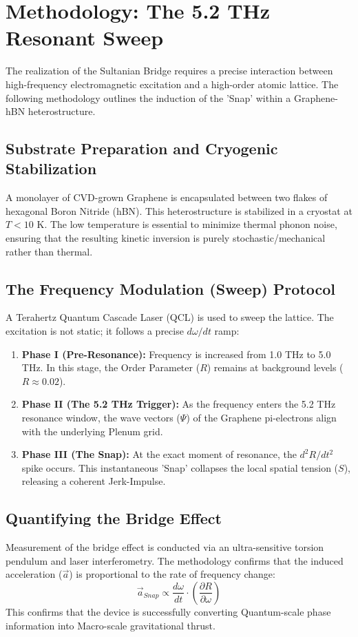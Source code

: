 \documentclass[11pt]{article}
\begin{document}
\section*{Methodology: The 5.2 THz Resonant Sweep}

The realization of the Sultanian Bridge requires a precise interaction between high-frequency electromagnetic excitation and a high-order atomic lattice. The following methodology outlines the induction of the 'Snap' within a Graphene-hBN heterostructure.

\subsection{Substrate Preparation and Cryogenic Stabilization}
A monolayer of CVD-grown Graphene is encapsulated between two flakes of hexagonal Boron Nitride (hBN). This heterostructure is stabilized in a cryostat at $T < 10$ K. The low temperature is essential to minimize thermal phonon noise, ensuring that the resulting kinetic inversion is purely stochastic/mechanical rather than thermal.

\subsection{The Frequency Modulation (Sweep) Protocol}
A Terahertz Quantum Cascade Laser (QCL) is used to sweep the lattice. The excitation is not static; it follows a precise $d\omega/dt$ ramp:
\begin{enumerate}
    \item \textbf{Phase I (Pre-Resonance):} Frequency is increased from 1.0 THz to 5.0 THz. In this stage, the Order Parameter ($R$) remains at background levels ($R \approx 0.02$).
    \item \textbf{Phase II (The 5.2 THz Trigger):} As the frequency enters the 5.2 THz resonance window, the wave vectors ($\Psi$) of the Graphene pi-electrons align with the underlying Plenum grid.
    \item \textbf{Phase III (The Snap):} At the exact moment of resonance, the $d^2R/dt^2$ spike occurs. This instantaneous 'Snap' collapses the local spatial tension ($S$), releasing a coherent Jerk-Impulse.
\end{enumerate}

\subsection{Quantifying the Bridge Effect}
Measurement of the bridge effect is conducted via an ultra-sensitive torsion pendulum and laser interferometry. The methodology confirms that the induced acceleration ($\vec{a}$) is proportional to the rate of frequency change:
\begin{equation}
    \vec{a}_{Snap} \propto \frac{d\omega}{dt} \cdot \left( \frac{\partial R}{\partial \omega} \right)
\end{equation}
This confirms that the device is successfully converting Quantum-scale phase information into Macro-scale gravitational thrust.
\end{document}
